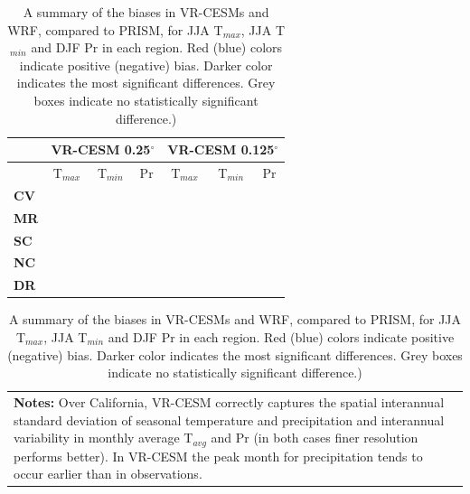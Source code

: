 \begin{table}
\begin{center}
\caption{A summary of the biases in VR-CESMs and WRF, compared to PRISM, for JJA T$_{max}$, JJA T$_{min}$ and DJF Pr in each region. Red (blue) colors indicate positive (negative) bias. Darker color indicates the most significant differences. Grey boxes indicate no statistically significant difference.)} \label{tab:summary}

\begin{tabular*}{5.5in}{l @{\extracolsep{\fill}}cccccc}
\hline \textbf{} & \multicolumn{3}{c}{\textbf{VR-CESM 0.25$^\circ$}} & \multicolumn{3}{c}{\textbf{VR-CESM 0.125$^\circ$}} \\
\hline & T$_{max}$ & T$_{min}$ & Pr & T$_{max}$ & T$_{min}$ & Pr  \\
\hline \textbf{CV} & \cellcolor{red!60}{2$-$3$^\circ$C} & \cellcolor{red!60}{2$-$3$^\circ$C} & \cellcolor{red!60}{70$-$100$\%$} & \cellcolor{red!60}{2$-$3$^\circ$C}  & \cellcolor{red!60}{2$-$3$^\circ$C} & \cellcolor{red!30}{30$-$60$\%$} \\

\hline \textbf{MR} &  \cellcolor{red!60}{2$-$3$^\circ$C} & \cellcolor{red!60}{2$-$4$^\circ$C} & \cellcolor{black!20} & \cellcolor{red!60}{2$^\circ$C}  & \cellcolor{red!60}{2$-$3$^\circ$C} & \cellcolor{black!20}  \\

\hline \textbf{SC} &   \cellcolor{blue!60}{2$^\circ$C} & \cellcolor{red!60}{2$-$3$^\circ$C}  & \cellcolor{black!20}  &  \cellcolor{blue!60}{2$^\circ$C} & \cellcolor{red!60}{2$-$3$^\circ$C}  & \cellcolor{black!20} \\

\hline \textbf{NC} & \cellcolor{blue!60}{2$-$3$^\circ$C} & \cellcolor{black!20} & \cellcolor{black!20} & \cellcolor{blue!60}{2$-$3$^\circ$C} & \cellcolor{black!20} & \cellcolor{black!20} \\

\hline \textbf{DR} & \cellcolor{black!20} & \cellcolor{red!60}{2$-$4$^\circ$C}  &  \cellcolor{red!60}{60$\%$} & \cellcolor{black!20} & \cellcolor{red!60}{2$-$4$^\circ$C}  &  \cellcolor{red!30}{30$\%$} \\

\hline
\end{tabular*}

\begin{tabular}{p{6in}}
\small\textbf{Notes:} Over California, VR-CESM correctly captures the spatial interannual standard deviation of seasonal temperature and precipitation and interannual variability in monthly average T$_{avg}$ and Pr (in both cases finer resolution performs better). In VR-CESM the peak month for precipitation tends to occur earlier than in observations.
\end{tabular}


\end{center}
\end{table}
